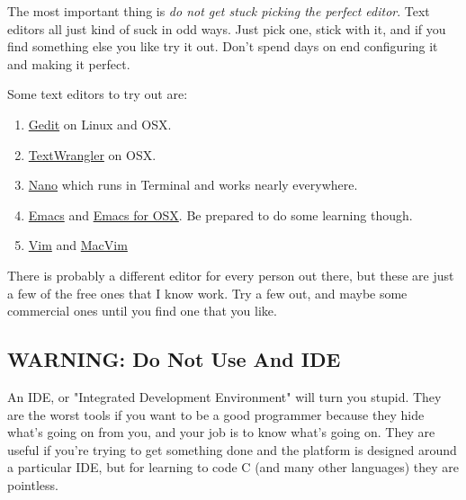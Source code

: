 The most important thing is \emph{do not get stuck picking the perfect editor}.
Text editors all just kind of suck in odd ways.  Just pick one, stick with it,
and if you find something else you like try it out.  Don't spend days
on end configuring it and making it perfect.

Some text editors to try out are:

\begin{enumerate}
\item \href{http://projects.gnome.org/gedit/}{Gedit} on Linux and OSX.
\item \href{http://www.barebones.com/products/textwrangler/}{TextWrangler} on OSX.
\item \href{http://www.nano-editor.org/}{Nano} which runs in Terminal and works nearly everywhere.
\item \href{http://www.gnu.org/software/emacs/}{Emacs} and \href{http://emacsformacosx.com/}{Emacs for OSX}.  Be prepared to do some learning though.
\item \href{http://www.vim.org/}{Vim} and \href{http://code.google.com/p/macvim/}{MacVim}
\end{enumerate}

There is probably a different editor for every person out there, but these are
just a few of the free ones that I know work.  Try a few out, and maybe some
commercial ones until you find one that you like.

\subsection{WARNING: Do Not Use And IDE}

An IDE, or "Integrated Development Environment" will turn you stupid.  They are
the worst tools if you want to be a good programmer because they hide what's
going on from you, and your job is to know what's going on.  They are useful
if you're trying to get something done and the platform is designed around 
a particular IDE, but for learning to code C (and many other languages) they
are pointless.


